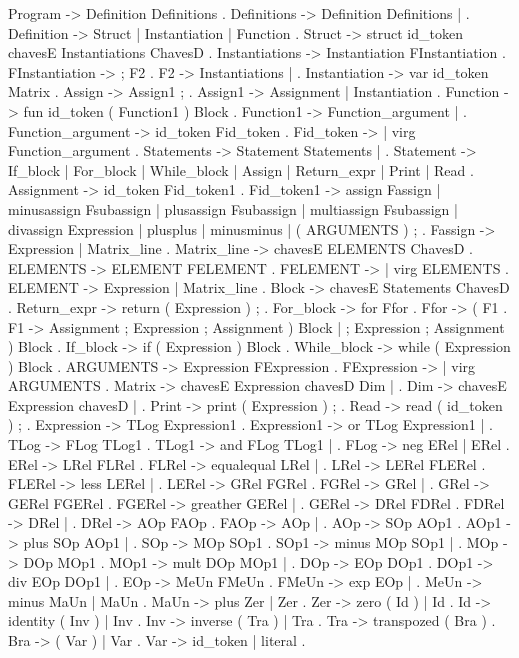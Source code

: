 Program ->   Definition Definitions .
Definitions -> Definition Definitions | .
Definition ->    Struct |   Instantiation |   Function .
Struct ->    struct id_token chavesE Instantiations ChavesD .
Instantiations -> Instantiation FInstantiation .
FInstantiation -> ; F2 .
F2 -> Instantiations |  .
Instantiation -> var id_token Matrix .
Assign ->    Assign1 ; .
Assign1 ->   Assignment |   Instantiation .
Function ->  fun id_token ( Function1 ) Block .
Function1 -> Function_argument |    .
Function_argument -> id_token Fid_token .
Fid_token ->  |   virg Function_argument .
Statements -> Statement Statements |  .
Statement -> If_block | For_block |   While_block |   Assign |   Return_expr |   Print |   Read .
Assignment ->    id_token Fid_token1 .
Fid_token1 ->    assign Fassign |   minusassign Fsubassign |   plusassign Fsubassign |   multiassign Fsubassign |   divassign Expression |   plusplus |   minusminus | ( ARGUMENTS ) ; .
Fassign ->   Expression |   Matrix_line .
Matrix_line ->   chavesE ELEMENTS ChavesD .
ELEMENTS ->  ELEMENT FELEMENT .
FELEMENT ->   |   virg ELEMENTS .
ELEMENT ->   Expression |   Matrix_line .
Block -> chavesE Statements ChavesD .
Return_expr ->   return ( Expression ) ; .
For_block -> for Ffor .
Ffor ->  ( F1 .
F1 ->    Assignment ; Expression ; Assignment ) Block |    ; Expression ; Assignment ) Block .
If_block ->  if ( Expression ) Block .
While_block ->   while ( Expression ) Block .
ARGUMENTS -> Expression FExpression .
FExpression ->  |   virg ARGUMENTS .
Matrix ->    chavesE Expression chavesD Dim | .
Dim ->   chavesE Expression chavesD |    .
Print -> print ( Expression ) ; .
Read ->  read ( id_token ) ; .
Expression ->    TLog Expression1 .
Expression1 ->   or TLog Expression1 |     .
TLog ->  FLog TLog1 .
TLog1 -> and FLog TLog1 |     .
FLog ->  neg ERel |   ERel .
ERel ->  LRel FLRel .
FLRel -> equalequal LRel |     .
LRel ->  LERel FLERel .
FLERel ->    less LERel |     .
LERel -> GRel FGRel .
FGRel -> \leq GRel |     .
GRel ->  GERel FGERel .
FGERel ->    greather GERel |     .
GERel -> DRel FDRel .
FDRel -> \geq DRel |     .
DRel ->  AOp FAOp .
FAOp ->  \neq AOp |     .
AOp ->   SOp AOp1 .
AOp1 ->  plus SOp AOp1 |     .
SOp ->   MOp SOp1 .
SOp1 ->  minus MOp SOp1 |     .
MOp ->   DOp MOp1 .
MOp1 ->  mult DOp MOp1 |     .
DOp ->   EOp DOp1 .
DOp1 ->  div EOp DOp1 |     .
EOp ->   MeUn FMeUn .
FMeUn -> exp EOp |     .
MeUn ->  minus MaUn |   MaUn .
MaUn ->  plus Zer |   Zer .
Zer ->   zero ( Id ) |   Id .
Id ->    identity ( Inv ) |   Inv .
Inv ->   inverse ( Tra ) |   Tra .
Tra ->   transpozed ( Bra ) .
Bra ->   ( Var ) | Var .
Var ->   id_token | literal .